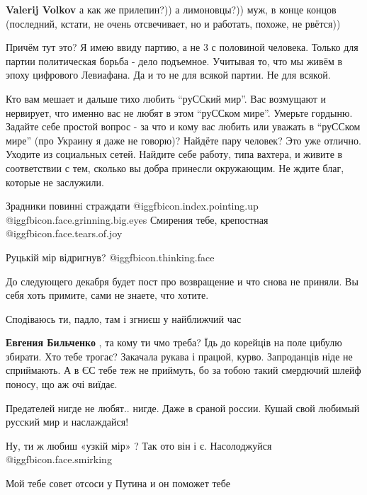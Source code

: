 \begin{itemize}
\begin{itemize} %
\textbf{Valerij Volkov} а как же прилепин?)) а лимоновцы?)) муж, в конце концов (последний, кстати, не очень отсвечивает, но и работать, похоже, не рвётся))

Причём тут это?
Я имею ввиду партию, а не 3 с половиной человека.
Только для партии политическая борьба - дело подъемное.
Учитывая то, что мы живём в эпоху цифрового Левиафана.
Да и то не для всякой партии. Не для всякой.
\end{itemize} %


Кто вам мешает и дальше тихо любить \enquote{руССкий мир}. Вас возмущают и нервирует,
что именно вас не любят в этом \enquote{руССком мире}. Умерьте гордыню. Задайте себе
простой вопрос - за что и кому вас любить или уважать в \enquote{руССком мире} (про
Украину я даже не говорю)? Найдёте пару человек? Это уже отлично. Уходите из
социальных сетей. Найдите себе работу, типа вахтера, и живите в соответствии с
тем, сколько вы добра принесли окружающим. Не ждите благ, которые не заслужили.


Зрадники повиннi страждати @igg{fbicon.index.pointing.up} @igg{fbicon.face.grinning.big.eyes} 
Смирения тебе, крепостная  @igg{fbicon.face.tears.of.joy} 

Руцькій мір відригнув?  @igg{fbicon.thinking.face} 

До следующего декабря будет пост про возвращение и что снова не приняли. Вы себя хоть примите, сами не знаете, что хотите.

Сподіваюсь ти, падло, там і згниєш у найближчий час

\textbf{Евгения Бильченко} , та кому ти чмо треба? Їдь до корейців на поле цибулю збирати. Хто тебе трогає? Закачала рукава і працюй, курво. Запроданців ніде не сприймають. А в ЄС тебе теж не приймуть, бо за тобою такий смердючий шлейф поносу, що аж очі виїдає.

Предателей нигде не любят.. нигде. Даже в сраной россии. Кушай свой любимый русский мир и наслаждайся!

Ну, ти ж любиш «узкій мір» ? Так ото він і є. Насолоджуйся  @igg{fbicon.face.smirking} 

Мой тебе совет отсоси у Путина и он поможет тебе


\end{itemize}
